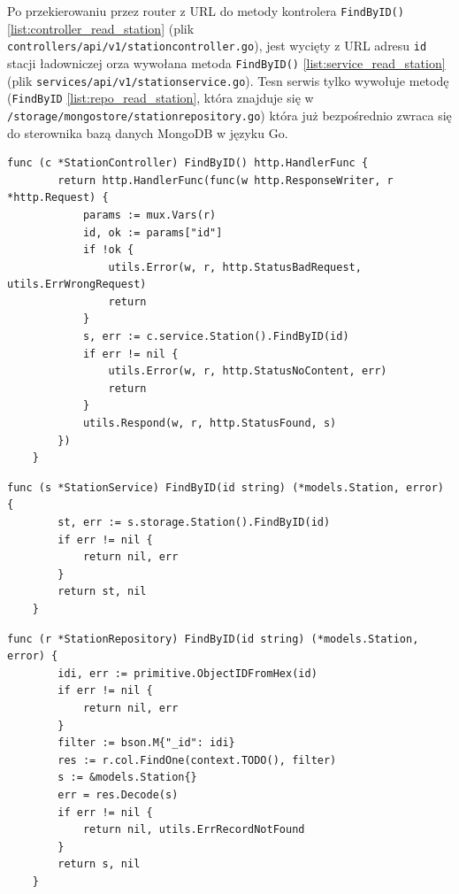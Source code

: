 Po przekierowaniu przez router z URL do metody kontrolera \texttt{FindByID()} \ref{list:controller_read_station} (plik \texttt{controllers/api/v1/stationcontroller.go}), jest wycięty z URL adresu \texttt{id} stacji ładowniczej orza wywołana metoda \texttt{FindByID()} \ref{list:service_read_station} (plik \texttt{services/api/v1/stationservice.go}).
Tesn serwis tylko wywołuje metodę (\texttt{FindByID} \ref{list:repo_read_station}, która znajduje się w \texttt{/storage/mongostore/stationrepository.go}) która już bezpośrednio zwraca się do sterownika bazą danych MongoDB w języku Go.
% 
\begin{lstlisting}[label=list:controller_read_station,caption=Kontroler wczytywania danych stacji ładowniczej,basicstyle=\tiny\ttfamily]
    func (c *StationController) FindByID() http.HandlerFunc {
        return http.HandlerFunc(func(w http.ResponseWriter, r *http.Request) {
            params := mux.Vars(r)
            id, ok := params["id"]
            if !ok {
                utils.Error(w, r, http.StatusBadRequest, utils.ErrWrongRequest)
                return
            }
            s, err := c.service.Station().FindByID(id)
            if err != nil {
                utils.Error(w, r, http.StatusNoContent, err)
                return
            }
            utils.Respond(w, r, http.StatusFound, s)
        })
    }
\end{lstlisting}

\begin{lstlisting}[label=list:service_read_station,caption=Serwis wczytywania danych stacji ładowniczej,basicstyle=\tiny\ttfamily]
    func (s *StationService) FindByID(id string) (*models.Station, error) {
        st, err := s.storage.Station().FindByID(id)
        if err != nil {
            return nil, err
        }
        return st, nil
    }
\end{lstlisting}

\begin{lstlisting}[label=list:repo_read_station,caption=Wyszukiwanie dokumentu w bazie danych,basicstyle=\tiny\ttfamily]
    func (r *StationRepository) FindByID(id string) (*models.Station, error) {
        idi, err := primitive.ObjectIDFromHex(id)
        if err != nil {
            return nil, err
        }
        filter := bson.M{"_id": idi}
        res := r.col.FindOne(context.TODO(), filter)
        s := &models.Station{}
        err = res.Decode(s)
        if err != nil {
            return nil, utils.ErrRecordNotFound
        }
        return s, nil
    }
\end{lstlisting}

